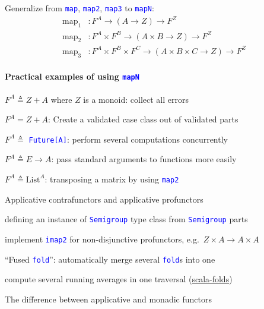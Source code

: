 Generalize from \texttt{\textcolor{blue}{\footnotesize{}map}}, \texttt{\textcolor{blue}{\footnotesize{}map2}},
\texttt{\textcolor{blue}{\footnotesize{}map3}} to \texttt{\textcolor{blue}{\footnotesize{}mapN}}:
\begin{align*}
\text{map}_{1} & :F^{A}\rightarrow\left(A\rightarrow Z\right)\rightarrow F^{Z}\\
\text{map}_{2} & :F^{A}\times F^{B}\rightarrow\left(A\times B\rightarrow Z\right)\rightarrow F^{Z}\\
\text{map}_{3} & :F^{A}\times F^{B}\times F^{C}\rightarrow\left(A\times B\times C\rightarrow Z\right)\rightarrow F^{Z}
\end{align*}


\paragraph{Practical examples of using \texttt{\textcolor{blue}{\footnotesize{}mapN}} }

\vspace{-0.2cm}$F^{A}\triangleq Z+A$ where $Z$ is a monoid: collect
all errors

$F^{A}=Z+A$: Create a validated case class out of validated parts

$F^{A}\triangleq$ \texttt{\textcolor{blue}{\footnotesize{}Future{[}A{]}}}:
perform several computations concurrently

$F^{A}\triangleq E\rightarrow A$: pass standard arguments to functions
more easily

$F^{A}\triangleq\text{List}^{A}$: transposing a matrix by using \texttt{\textcolor{blue}{\footnotesize{}map2}} 

Applicative contrafunctors and applicative profunctors

defining an instance of \texttt{\textcolor{blue}{\footnotesize{}Semigroup}}
type class from \texttt{\textcolor{blue}{\footnotesize{}Semigroup}}
parts

implement \texttt{\textcolor{blue}{\footnotesize{}imap2}} for non-disjunctive
profunctors, e.g.\ $Z\times A\rightarrow A\times A$

``Fused \texttt{\textcolor{blue}{\footnotesize{}fold}}'': automatically
merge several \texttt{\textcolor{blue}{\footnotesize{}fold}}s into
one

compute several running averages in one traversal (\href{https://github.com/amarpotghan/scala-fold}{scala-folds})

The difference between applicative and monadic functors

